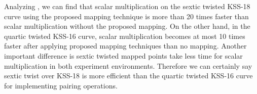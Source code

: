 \renewcommand{\arraystretch}{1.5}{
\begin{table}[ht]
\centering
\caption{ Comparative result of average execution time in [ms] for scalar multiplication.}
\label{table_opeationcomp_chap_ijnc2017}
\end{table}
}

Analyzing   , we can find that scalar multiplication on the sextic twisted KSS-18 curve using the proposed  mapping technique is more than 20 times faster than scalar multiplication without the proposed mapping. 
On the other hand, in the quartic twisted KSS-16 curve, scalar multiplication becomes at most 10 times faster after applying proposed mapping techniques than no mapping. 
Another important difference is sextic twisted mapped points take less  time for scalar multiplication in both experiment environments. Therefore we can certainly say sextic twist over KSS-18 is more efficient than the quartic twisted KSS-16 curve for implementing  pairing operations.


